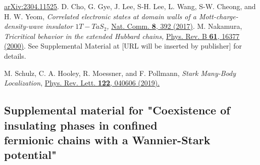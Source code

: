 \documentclass[aps,prl,showpacs,twocolumn,superscriptaddress]{revtex4-2}
\begin{document}
\begin{thebibliography}{99}
\href{https://arxiv.org/abs/2304.11525}{arXiv:2304.11525}.
D. Cho, G. Gye, J. Lee, S-H. Lee, L. Wang, S-W. Cheong, and H. W. Yeom,
{\it Correlated electronic states at domain walls of a Mott-charge-density-wave insulator $1T-TaS_2$,}
\href{https://doi.org/10.1038/s41467-017-00438-2}{Nat. Comm. {\bf 8}, 392 (2017)}.
M. Nakamura,
{\it Tricritical behavior in the extended Hubbard chains,}
\href{https://doi.org/10.1103/PhysRevB.61.16377}{Phys. Rev. B {\bf 61}, 16377 (2000)}.
See Supplemental Material at [URL will be inserted by publisher] for details.

 M. Schulz, C. A. Hooley, R. Moessner, and F. Pollmann, {\it Stark Many-Body Localization},
\href{https://doi.org/10.1103/PhysRevLett.122.040606}{
Phys. Rev. Lett. {\bf 122}, 040606 (2019).}

\end{thebibliography}


\newpage

\newpage

\widetext
\begin{center}


\section{Supplemental material for "Coexistence of insulating phases in confined \\fermionic chains with a Wannier-Stark potential"}
\end{center}
\setcounter{equation}{0}
\setcounter{figure}{0}
\setcounter{table}{0}
\setcounter{page}{1}
\makeatletter
\renewcommand{\theequation}{S\arabic{equation}}
\renewcommand{\thefigure}{S\arabic{figure}}
\renewcommand{\bibnumfmt}[1]{[S#1]}
\renewcommand{\citenumfont}[1]{S#1}


\author{N. Aucar Boidi}
\end{document}

